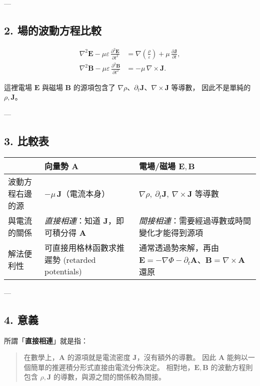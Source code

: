 \documentclass{article}
\begin{document}
---

\subsection*{2. 場的波動方程比較}

\begin{align}
\nabla^2 \mathbf{E}-\mu\varepsilon\,\frac{\partial^2 \mathbf{E}}{\partial t^2}
&=\nabla\!\left(\frac{\rho}{\varepsilon}\right)+\mu\,\frac{\partial \mathbf{J}}{\partial t},
\\[6pt]
\nabla^2 \mathbf{B}-\mu\varepsilon\,\frac{\partial^2 \mathbf{B}}{\partial t^2}
&=-\mu\,\nabla\times\mathbf{J}.
\end{align}

這裡電場 $\mathbf{E}$ 與磁場 $\mathbf{B}$ 的源項包含了
\(\nabla\rho\)、\(\partial_t \mathbf{J}\)、\(\nabla\times\mathbf{J}\) 等導數，
因此不是單純的 $\rho,\mathbf{J}$。

---

\subsection*{3. 比較表}

\renewcommand{\arraystretch}{1.4}
\begin{tabular}{|>{\raggedright}m{4cm}|>{\raggedright}m{5cm}|>{\raggedright\arraybackslash}m{5cm}|}
\hline
 & \textbf{向量勢 $\mathbf{A}$} & \textbf{電場/磁場 $\mathbf{E},\mathbf{B}$} \\
\hline
波動方程右邊的源 &
$-\mu\,\mathbf{J}$（電流本身） &
$\nabla\rho,\ \partial_t \mathbf{J},\ \nabla\times\mathbf{J}$ 等導數 \\
\hline
與電流的關係 &
\emph{直接相連}：知道 $\mathbf{J}$，即可積分得 $\mathbf{A}$ &
\emph{間接相連}：需要經過導數或時間變化才能得到源項 \\
\hline
解法便利性 &
可直接用格林函數求推遲勢 (retarded potentials) &
通常透過勢來解，再由 $\mathbf{E}=-\nabla\Phi-\partial_t\mathbf{A}$、$\mathbf{B}=\nabla\times\mathbf{A}$ 還原 \\
\hline
\end{tabular}

---

\subsection*{4. 意義}
所謂「\textbf{直接相連}」就是指：
\begin{quote}
在數學上，$\mathbf{A}$ 的源項就是電流密度 $\mathbf{J}$，沒有額外的導數。
因此 $\mathbf{A}$ 能夠以一個簡單的推遲積分形式直接由電流分佈決定。
相對地，$\mathbf{E},\mathbf{B}$ 的波動方程則包含 $\rho,\mathbf{J}$ 的導數，與源之間的關係較為間接。
\end{quote}
\end{document}
